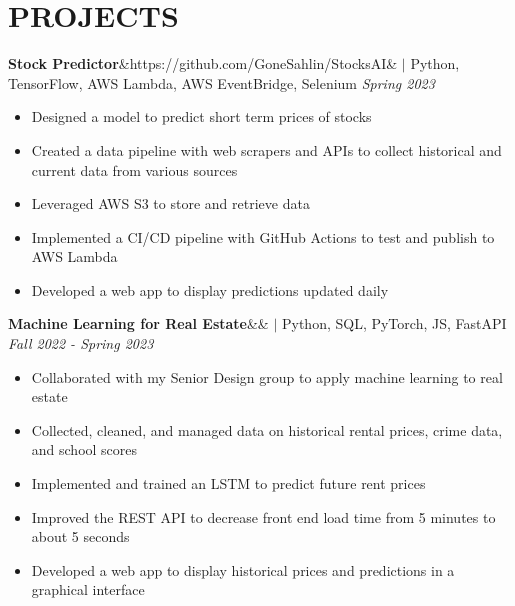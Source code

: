 \documentclass[11pt, a4paper, roman]{moderncv}
\newcommand{\project}[5]{
	\textbf{#1}\ifx&#2&{}
	\else
    		\href{#2}{\:\small\faGithub\:}\fi$|$ #3
	\hfill\textit{#4}
	#5
	\vspace{2mm}
}
\begin{document}
\vspace*{-2mm}
\section{PROJECTS}

{\project{Stock Predictor}{https://github.com/GoneSahlin/StocksAI}{Python, TensorFlow, AWS Lambda, AWS EventBridge, Selenium}{Spring 2023}
	{\begin{itemize}
		\item Designed a model to predict short term prices of stocks
		\item Created a data pipeline with web scrapers and APIs to collect historical and current data from various sources
		\item Leveraged AWS S3 to store and retrieve data
		\item Implemented a CI/CD pipeline with GitHub Actions to test and publish to AWS Lambda
		\item Developed a web app to display predictions updated daily
	\end{itemize}}
}

{\project{Machine Learning for Real Estate}{}{Python, SQL, PyTorch, JS, FastAPI}{Fall 2022 - Spring 2023}
	{\begin{itemize}
		\item Collaborated with my Senior Design group to apply machine learning to real estate
		\item Collected, cleaned, and managed data on historical rental prices, crime data, and school scores
		\item Implemented and trained an LSTM to predict future rent prices
		\item Improved the REST API to decrease front end load time from 5 minutes to about 5 seconds
		\item Developed a web app to display historical prices and predictions in a graphical interface
	\end{itemize}}
}
\end{document}
